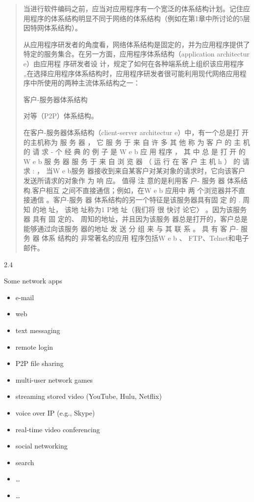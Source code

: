 \documentclass[
]{article}
\begin{document}
\begin{quote}
当进行软件编码之前，应当对应用程序有一个宽泛的体系结构计划。记住应用程序的体系结构明显不同于网络的体系结构（例如在第1章中所讨论的5层因特网体系结构）。

从应用程序研发者的角度看，网络体系结构是固定的，并为应用程序提供了特定的服务集合。在另一方面，应用程序体系结构（application
architectur e）由应用程 序研发者设
计，规定了如何在各种端系统上组织该应用程序„在选择应用程序体系结构时，应用程序研发者很可能利用现代网络应用程序中所使用的两种主流体系结构之一：

客户-服务器体系结构

对等（P2P）体系结构。

在客户-服务器体系结构（client-server architectur e）中，有一个总是打
开的主机称为 服 务 器 ， 它 服 务 于 来 自 许 多 其 他 称 为 客 户 的 主
机 的 请 求 - 个 经 典 的 例 子 是 W e b 应 用 程序 ， 其 中 总 是 打 开
的 W e b 服 务 器 服 务 于 来 自 浏 览 器 （ 运 行 在 客 户 主 机 h ）
的 请 求 : ， 当W e b服务
器接收到来自某客户对某对象的请求时，它向该客户发送所请求的对象作 为 响
应。 值得 注 意的是利用客 户- 服务 器 体系结构.客户相互
之间不直接通信；例如，在W e b 应用中 两 个浏览器并不直接通信 。客户-服务
器 体系结构的另一个特征是该服务器具有固 定 的 . 周 知 的地 址， 该地
址称为1 P地 址（我们将 很 快讨 论它〉 。因为该服务 器 具有 固 定的、
周知的地址，并且因为该服务 器总是打开的，客户总是能够通过向该服务
器的地址 发 送 分 组 来 与 其 联 系 。 具 有 客 户- 服务 器 体系 结构的
非常著名的应用 程序包括W e b 、 FTP、Telnet和电子邮件。
\end{quote}

2.4

Some network apps

\begin{itemize}
\item
  e-mail
\item
  web
\item
  text messaging
\item
  remote login
\item
  P2P file sharing
\item
  multi-user network games
\item
  streaming stored video (YouTube, Hulu, Netflix)
\item
  voice over IP (e.g., Skype)
\item
  real-time video conferencing
\item
  social networking
\item
  search
\item
  \ldots{}
\item
  \ldots{}
\end{itemize}
\end{document}

